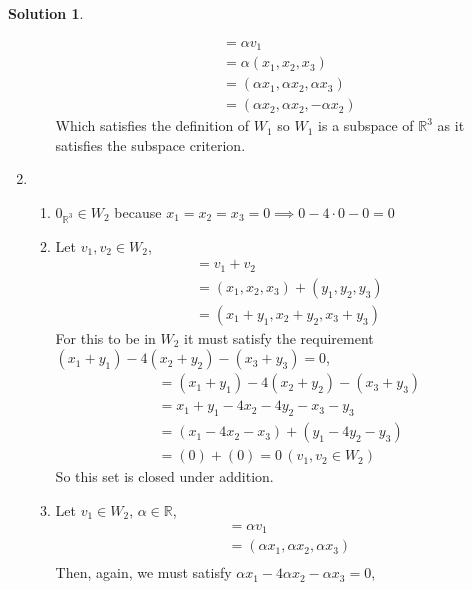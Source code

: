 \documentclass[10pt]{article}
\theoremstyle{definition}
\newtheorem{soln}{Solution}
\begin{document}
\begin{soln}
\begin{enumerate}[label=(\alph*)]
\begin{enumerate}[label=(\roman*)]
\begin{align*}
                     & = \alpha v_1                          \\
                     & = \alpha(x_1,x_2,x_3)                 \\
                     & = (\alpha x_1,\alpha x_2,\alpha x_3)  \\
                     & = (\alpha x_2,\alpha x_2,-\alpha x_2)
                  \end{align*}
                  Which satisfies the definition of $W_1$ so $W_1$ is a subspace of $\mathbb{R}^3$ as it satisfies the subspace criterion.
          \end{enumerate}
    \item \begin{enumerate}[label=(\roman*)]
            \item $0_{\mathbb{R}^3}\in W_2$ because $x_1=x_2=x_3=0\implies 0-4\cdot0-0=0$
            \item Let $v_1,v_2\in W_2$,
                  \begin{align*}
                     & = v_1+v_2                     \\
                     & = (x_1,x_2,x_3)+(y_1,y_2,y_3) \\
                     & = (x_1+y_1,x_2+y_2,x_3+y_3)
                  \end{align*}
                  For this to be in $W_2$ it must satisfy the requirement $(x_1+y_1)-4(x_2+y_2)-(x_3+y_3)=0$,
                  \begin{align*}
                     & = (x_1+y_1)-4(x_2+y_2)-(x_3+y_3) \\
                     & = x_1+y_1-4x_2-4y_2-x_3-y_3      \\
                     & = (x_1-4x_2-x_3)+(y_1-4y_2-y_3)  \\
                     & = (0)+(0)=0 \, (v_1,v_2\in W_2)
                  \end{align*}
                  So this set is closed under addition.
            \item Let $v_1\in W_2$, $\alpha\in\mathbb{R}$,
                  \begin{align*}
                     & = \alpha v_1                         \\
                     & = (\alpha x_1,\alpha x_2,\alpha x_3) \\
                  \end{align*}
                  Then, again, we must satisfy $\alpha x_1-4\alpha x_2-\alpha x_3=0$,
                  \begin{align*}

\end{align*}
\end{enumerate}
\end{enumerate}
\end{soln}
\end{document}
